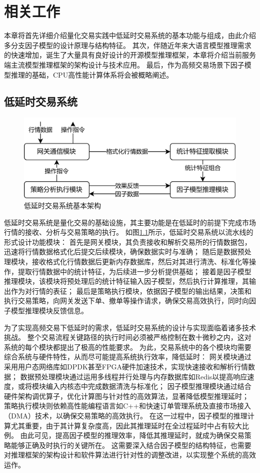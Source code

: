 \chapter{相关工作}


本章将首先详细介绍量化交易实践中低延时交易系统的基本功能与组成，由此介绍多分支因子模型的设计原理与结构特征。
其次，伴随近年来大语言模型推理需求的快速增加，诞生了大量具有良好设计的开源模型推理框架，本章将介绍当前服务端主流模型推理框架的架构设计与技术应用。
最后，作为高频交易场景下因子模型推理的基础，CPU高性能计算体系将会被概略阐述。

\section{低延时交易系统}
\begin{figure}[h]
    \centering
    \includegraphics[width=1\textwidth]{image/chap02/lowlat.png}
    \caption{低延时交易系统基本架构}
    \label{fig:lowlatencysystem}
\end{figure}
低延时交易系统是量化交易的基础设施，其主要功能是在低延时的前提下完成市场行情的接收、分析与交易策略的执行。
如图\ref{fig:lowlatencysystem}所示，低延时交易系统以流水线的形式设计功能模块：
首先是网关模块，其负责接收和解析交易所的行情数据包，迅速将行情数据格式化后提交后续模块，确保数据实时与准确；
随后是数据预处理模块，接收格式化行情数据后更新内存数据库，然后对其进行清洗、标准化等操作，提取行情数据中的统计特征，为后续进一步分析提供基础；
接着是因子模型推理模块，该模块将预处理后的统计特征输入因子模型，然后执行计算推理，其输出作为对行情的表征；
最后是策略执行模块，依据因子模型的输出结果，决策和执行交易策略，向网关发送下单、撤单等操作请求，确保交易高效执行，同时向因子模型推理模块反馈信息。

为了实现高频交易下低延时的需求，低延时交易系统的设计与实现面临着诸多技术挑战。
整个交易流程关键路径的执行时间必须被严格控制在数十微秒之内，这对系统的每个模块都提出了极高的性能要求。
为此，交易系统中的各个模块均需要综合系统与硬件特性，从而尽可能提高系统执行效率，降低延时：
网关模块通过采用用户态网络库如DPDK甚至FPGA硬件加速技术，实现快速接收和解析行情数据；
数据预处理模块通过运用多线程并行处理与内存数据库如Redis以提高响应速度，或将模块编入内核态中完成数据清洗与标准化；
因子模型推理模块通过结合硬件架构调优算子，优化计算图与针对性的高效算法，显著降低模型推理延时；
策略执行模块则依赖高性能编程语言如C++和快速订单管理系统及直接市场接入（DMA）技术，以确保交易策略的高效执行。
在这一过程中，因子模型的推理计算尤其重要，由于其计算复杂度高，因此其推理延时在全过程延时中占有较大比例。
由此可见，提高因子模型的推理效率，降低其推理延时，就成为确保交易策略能够正确及时执行的关键所在。
这需要深入结合因子模型的结构特征，也需要对推理框架的架构设计和软件算法进行针对性的调整改进，以实现整个系统的高效运作。

